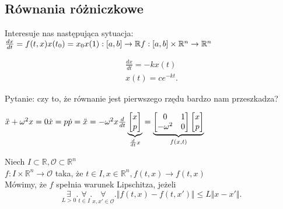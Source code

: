 \documentclass[../main.tex]{subfiles}
\begin{document}
    \subsection{Równania różniczkowe}
    Interesuje nas następująca sytuacja:
        $
        \frac{dx}{dt} = f(t,x) \\
        x(t_0)= x_0\\
        x(1): [a,b]\to\mathbb{R}\\
        f: [a,b]\times \mathbb{R}^n\to\mathbb{R}^n
        $
        \begin{przyklad}
            \begin{align*}
                \frac{dx}{dt} = -kx(t)\\
                x(t) = c e^{-kt}
            .\end{align*}
        \end{przyklad}
        Pytanie: czy to, że równanie jest pierwszego rzędu bardzo nam przeszkadza?\\
        \begin{przyklad}
            $\ddot{x} + \omega^2 x = 0\\
            \dot{x} = p\\
            \dot{p} = \ddot{x} = -\omega^2 x\\
            \frac{d}{dt} \underbrace{\begin{bmatrix} x\\p \end{bmatrix}}_{\frac{d}{dt}x} =
            \underbrace{\begin{bmatrix} 0&1\\ -\omega^2&0 \end{bmatrix}
            \begin{bmatrix} x\\p \end{bmatrix}}_{f(x,t)}
            $

        \end{przyklad}
        \begin{definicja}
            Niech $I\subset \mathbb{R}, \mathcal{O}\subset \mathbb{R}^n$ \\
            $f: I\times\mathbb{R}^n \to \mathcal{O}$ taka, że $t\in I, x\in \mathbb{R}^n, f(t,x) \to f(t,x)$\\
            Mówimy, że $f$ spełnia warunek Lipschitza, jeżeli
            \[
                \underset{L>0}{\exists}. \underset{t\in I}{\forall}. \underset{x,x'\in \mathcal{O}}{\forall}. \Vert f(t,x) - f(t,x')  \Vert \leq L \Vert x - x' \Vert
            .\]
        \end{definicja}
\end{document}
